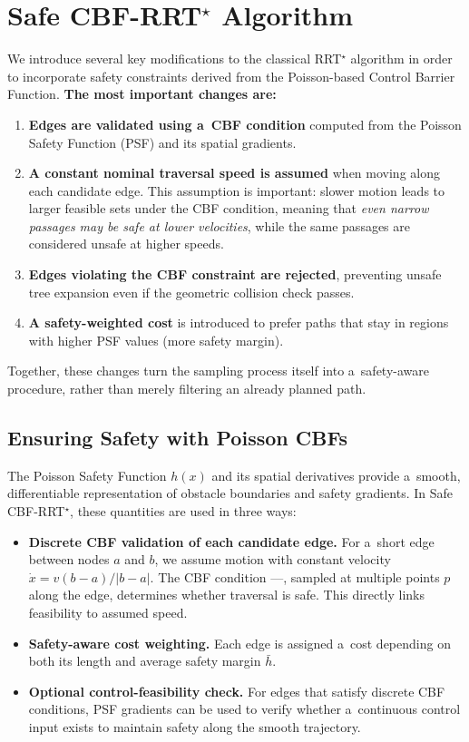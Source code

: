 \documentclass{svproc}
\begin{document}
\section{Safe CBF-RRT$^\star$ Algorithm}
We introduce several key modifications to the classical RRT$^\star$
algorithm in order to incorporate safety constraints derived from
the Poisson-based Control Barrier Function.
\textbf{The most important changes are:}
\begin{enumerate}
    \item \textbf{Edges are validated using a~CBF condition} computed
    from the Poisson Safety Function (PSF) and its spatial gradients.
    \item \textbf{A constant nominal traversal speed is assumed} when
    moving along each candidate edge. This assumption is important: 
    slower motion leads to larger feasible sets under the CBF condition,
    meaning that \emph{even narrow passages may be safe at lower velocities},
    while the same passages are considered unsafe at higher speeds.
    \item \textbf{Edges violating the CBF constraint are rejected},
    preventing unsafe tree expansion even if the geometric collision
    check passes.
    \item \textbf{A safety-weighted cost} is introduced to prefer paths
    that stay in regions with higher PSF values (more safety margin).
\end{enumerate}
Together, these changes turn the sampling process itself into
a~safety-aware procedure, rather than merely filtering an already planned path.

\subsection{Ensuring Safety with Poisson CBFs}
The Poisson Safety Function $h(x)$ and its spatial derivatives provide
a~smooth, differentiable representation of obstacle boundaries and safety
gradients. In Safe CBF-RRT$^\star$, these quantities are used in three ways:
\begin{itemize}
    \item \textbf{Discrete CBF validation of each candidate edge.}
    For a~short edge between nodes $a$ and $b$, we assume motion with constant velocity $\dot{x}=v(b-a)/|b-a|$.
    The CBF condition ---,
    sampled at multiple points $p$ along the edge, determines whether traversal is safe.
    This directly links feasibility to assumed speed.
    \item \textbf{Safety-aware cost weighting.}
    Each edge is assigned a~cost depending on both its length and average safety margin $\bar h$.
    \item \textbf{Optional control-feasibility check.}
    For edges that satisfy discrete CBF conditions, PSF gradients can be used to verify whether a~continuous control input exists to maintain safety along the smooth trajectory.
\end{itemize}
\end{document}
